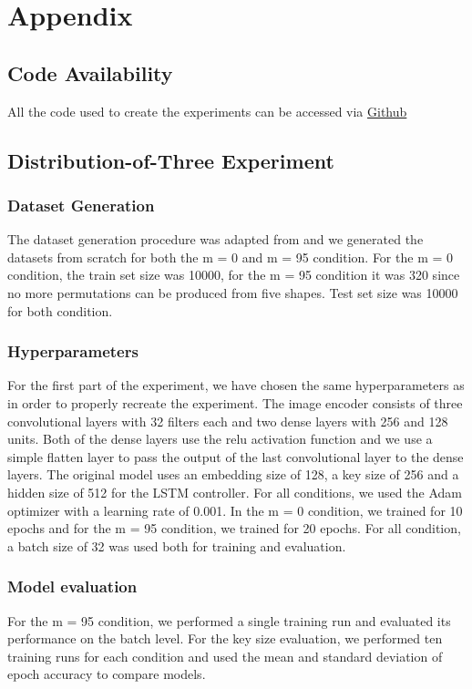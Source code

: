 \section{Appendix}
\subsection{Code Availability}
All the code used to create the experiments can be accessed via \hyperlink{https://github.com/Jonathank2510/esbn_abstractor/tree/main}{Github}

\subsection{Distribution-of-Three Experiment}
\subsubsection{Dataset Generation}
The dataset generation procedure was adapted from \textcite{webb_emergent_2021} and we generated the datasets from scratch for both the m = 0 and m = 95 condition. For the m = 0 condition, the train set size was 10000, for the m = 95 condition it was 320 since no more permutations can be produced from five shapes. Test set size was 10000 for both condition.
\subsubsection{Hyperparameters}
For the first part of the experiment, we have chosen the same hyperparameters as \textcite{webb_emergent_2021} in order to properly recreate the experiment. The image encoder consists of three convolutional layers with 32 filters each and two dense layers with 256 and 128 units. Both of the dense layers use the relu activation function and we use a simple flatten layer to pass the output of the last convolutional layer to the dense layers. \newline
The original model uses an embedding size of 128, a key size of 256 and a hidden size of 512 for the LSTM controller. \newline
For all conditions, we used the Adam \textcite{kingma_adam_2017} optimizer with a learning rate of 0.001. In the m = 0 condition, we trained for 10 epochs and for the m = 95 condition, we trained for 20 epochs. For all condition, a batch size of 32 was used both for training and evaluation.
\subsubsection{Model evaluation}
For the m = 95 condition, we performed a single training run and evaluated its performance on the batch level. For the key size evaluation, we performed ten training runs for each condition and used the mean and standard deviation of epoch accuracy to compare models.

